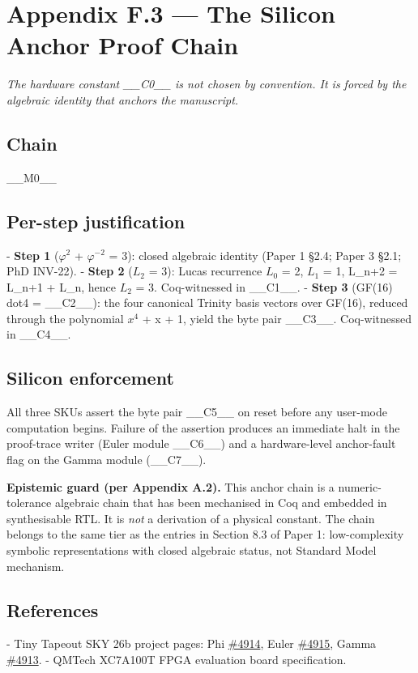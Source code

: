 
\section{Appendix F.3 --- The Silicon Anchor Proof Chain}

\textit{The hardware constant \_\_C0\_\_ is not chosen by convention. It is forced by the algebraic identity that anchors the manuscript.}

\subsection{Chain}

\_\_M0\_\_

\subsection{Per-step justification}

- \textbf{Step 1} ($\varphi^{2}$ + $\varphi^{-2}$ = 3): closed algebraic identity (Paper 1 §2.4; Paper 3 §2.1; PhD INV-22).
- \textbf{Step 2} ($L_{2}$ = 3): Lucas recurrence $L_{0}$ = 2, $L_{1}$ = 1, L\_{n+2} = L\_{n+1} + L\_n, hence $L_{2}$ = 3. Coq-witnessed in \_\_C1\_\_.
- \textbf{Step 3} (GF(16) dot4 = \_\_C2\_\_): the four canonical Trinity basis vectors over GF(16), reduced through the polynomial $x^{4}$ + x + 1, yield the byte pair \_\_C3\_\_. Coq-witnessed in \_\_C4\_\_.

\subsection{Silicon enforcement}

All three SKUs assert the byte pair \_\_C5\_\_ on reset before any user-mode computation begins. Failure of the assertion produces an immediate halt in the proof-trace writer (Euler module \_\_C6\_\_) and a hardware-level anchor-fault flag on the Gamma module (\_\_C7\_\_).

\textbf{Epistemic guard (per Appendix A.2).} This anchor chain is a numeric-tolerance algebraic chain that has been mechanised in Coq and embedded in synthesisable RTL. It is \textit{not} a derivation of a physical constant. The chain belongs to the same tier as the entries in Section 8.3 of Paper 1: low-complexity symbolic representations with closed algebraic status, not Standard Model mechanism.

\subsection{References}

- Tiny Tapeout SKY 26b project pages: Phi \href{https://app.tinytapeout.com/projects/4914}{\#4914}, Euler \href{https://app.tinytapeout.com/projects/4915}{\#4915}, Gamma \href{https://app.tinytapeout.com/projects/4913}{\#4913}.
- QMTech XC7A100T FPGA evaluation board specification.
